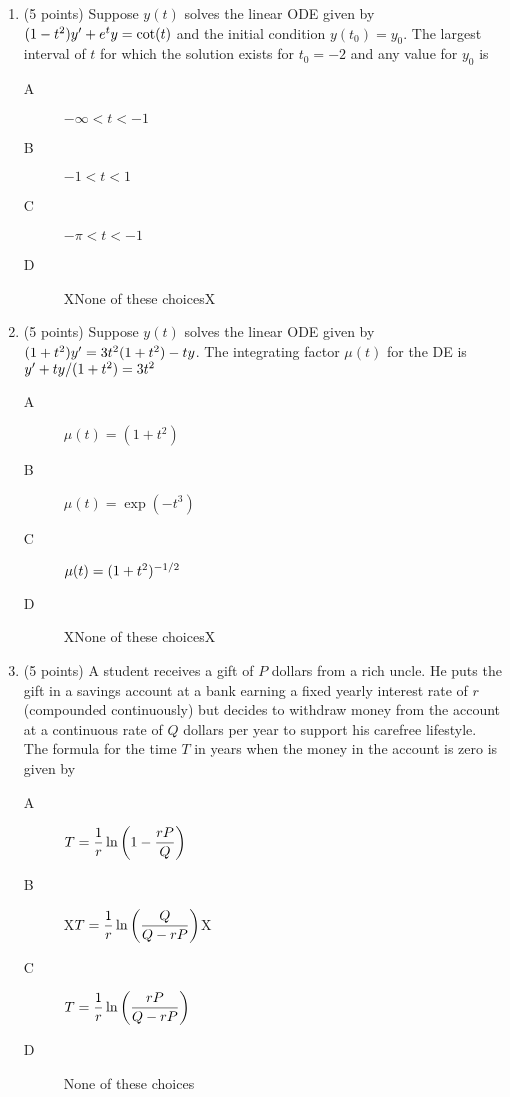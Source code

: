 \documentclass{article}
\begin{document}
\begin{enumerate}

\item (5 points) Suppose $y(t)$ solves the linear ODE given by $(1-t^2)y' + e\sp ty= \cot(t)$ and the initial condition $y(t_0)=y_0$.  The largest interval of $t$ for which the solution exists for $t_0=-2$ and any value for $y_0$ is 
\begin{description}
\item[A] $-\infty<t<-1$
\item[B] $-1<t<1$
\item[C] $-\pi<t<-1$
\item[D] XNone of these choicesX
\end{description}

\item (5 points) Suppose $y(t)$ solves the linear ODE given by $(1+t^2)y' = 3t\sp2(1+t\sp2)-ty$.  The integrating factor $\mu(t)$ for the DE is
\\$y'+ty/(1+t^2) = 3t\sp2$
\begin{description}
\item[A] $\mu(t)=(1+t^2)$
\item[B] $\mu(t)=\exp(-t^3)$
\item[C] $\mu(t)=(1+t^2)\sp{-1/2}$
\item[D] XNone of these choicesX
\end{description}

\newpage
\item (5 points) A student receives a gift of $P$ dollars from a rich uncle.  He puts the gift in a savings account at a bank earning a fixed yearly interest rate of $r$ (compounded continuously) but decides to withdraw money from the account at a continuous rate of $Q$ dollars per year to support his carefree lifestyle.  The formula for the time $T$ in years when the money in the account is zero is given by
\begin{description}
\item[A] $\displaystyle{T={1\over r}\ln\left(1-{rP\over Q}\right)}$
\item[B] X$\displaystyle{T={1\over r}\ln\left({Q\over Q-rP}\right)}$X
\item[C] $\displaystyle{T={1\over r}\ln\left({rP\over Q-rP}\right)}$
\item[D] None of these choices
\end{description}


\end{enumerate}
\end{document}
